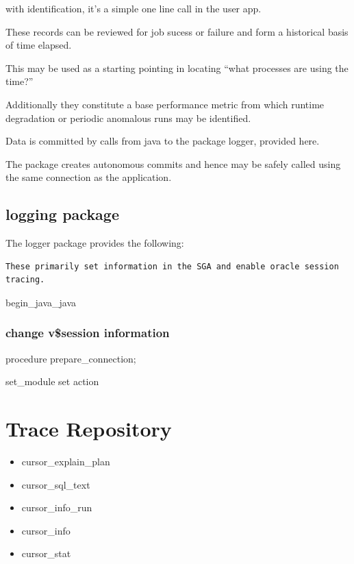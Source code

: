 \documentclass[letterpaper,10pt,english]{sphinxmanual}
\begin{document}
with identification, it's a simple one line call in the user app.

These records can be reviewed for job sucess or failure and form a
historical basis of time elapsed.

This may be used as a starting pointing in locating ``what processes are
using the time?''

Additionally they constitute a base performance metric from which
runtime degradation or periodic anomalous runs may be identified.

Data is committed by calls from java to the package logger, provided
here.

The package creates autonomous commits and hence may be safely called
using the same connection as the application.


\subsection{logging package}
\label{index:logging-package}
The logger package provides the following:

\begin{Verbatim}[commandchars=\\\{\}]
These primarily set information in the SGA and enable oracle session tracing.
\end{Verbatim}

begin\_java\_java


\subsubsection{change v\$session information}
\label{index:change-v-session-information}
procedure prepare\_connection;

set\_module set action


\section{Trace Repository}
\label{index:trace-repository}\begin{itemize}
\item {} 
cursor\_explain\_plan

\item {} 
cursor\_sql\_text

\item {} 
cursor\_info\_run

\item {} 
cursor\_info

\item {} 
cursor\_stat

\end{itemize}
\end{document}
